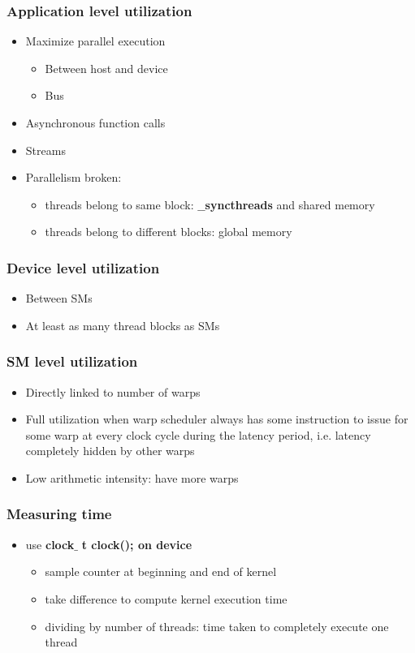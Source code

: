 \begin{frame}\frametitle{Application level utilization}\logoEvolution\mypagenum
	\begin{itemize}
		\item Maximize parallel execution
		\begin{itemize}
			\item Between host and device
			\item Bus
		\end{itemize}
		\item Asynchronous function calls	
		\item Streams
		\item Parallelism broken:
		\begin{itemize}
			\item threads belong to same block: $\_\_$\textbf{syncthreads} and shared memory
			\item threads belong to different blocks: global memory
		\end{itemize}
	\end{itemize}
\end{frame}



\begin{frame}\frametitle{Device level utilization}\logoEvolution\mypagenum
	\begin{itemize}
		\item Between SMs
		\item At least as many thread blocks as SMs
	\end{itemize}
\end{frame}




\begin{frame}\frametitle{SM level utilization}\logoEvolution\mypagenum
	\begin{itemize}
		\item Directly linked to number of warps	
		\item Full utilization when warp scheduler always has some instruction to issue for some warp at every clock cycle during the latency period, i.e. latency completely hidden by other warps
		\item Low arithmetic intensity: have more warps
	\end{itemize}
\end{frame}


\begin{frame}\frametitle{Measuring time}\logoEvolution\mypagenum
	\begin{itemize}
		\item use \textbf{clock}$\_$ \textbf{t clock(); on device}
		\begin{itemize}
			\item sample counter at beginning and end of kernel
			\item take difference to compute kernel execution time
			\item dividing by number of threads: time taken to completely execute one thread
		\end{itemize}
	\end{itemize}
\end{frame}


